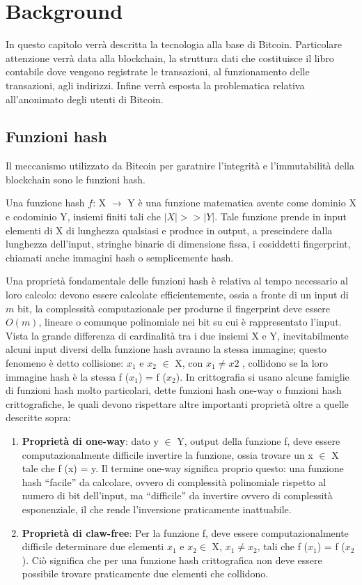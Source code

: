 \chapter{Background}
In questo capitolo verrà descritta la tecnologia alla base di Bitcoin. Particolare attenzione verrà data alla blockchain, la struttura dati che costituisce il libro contabile dove vengono registrate le transazioni, al funzionamento delle transazioni, agli indirizzi. Infine verrà esposta la problematica relativa all'anonimato degli utenti di Bitcoin. 
\section{Funzioni hash}
Il meccanismo utilizzato da Bitcoin per garatnire l'integrità e l'immutabilità della  blockchain sono le funzioni hash.

Una funzione hash $f$: X $\longrightarrow$ Y è una funzione matematica avente come dominio X e codominio Y, insiemi finiti tali che $|X| >> |Y |$. Tale funzione prende in input elementi di X di lunghezza qualsiasi e produce in output, a prescindere dalla lunghezza dell’input, stringhe binarie di dimensione fissa, i cosiddetti fingerprint, chiamati anche immagini hash o semplicemente hash.

Una proprietà fondamentale delle funzioni hash è relativa al tempo necessario al loro calcolo: devono essere calcolate efficientemente, ossia a fronte di un input di $m$ bit, la complessità computazionale per produrne il fingerprint deve essere $O(m)$, lineare o comunque polinomiale nei bit su cui è rappresentato l’input.
Vista la grande differenza di cardinalità tra i due insiemi X e Y, inevitabilmente alcuni input diversi della funzione hash avranno la stessa immagine; questo fenomeno è detto collisione: $x_1$ e $x_2$ $\in$ X, con $x_1 \neq x2$ , collidono se la loro immagine hash è la stessa f ($x_1$) = f ($x_2$).
In crittografia si usano alcune famiglie di funzioni hash molto particolari, dette funzioni hash one-way o funzioni hash crittografiche, le quali devono rispettare altre importanti proprietà oltre a quelle descritte sopra:
\begin{enumerate}
    \item \textbf{Proprietà di one-way}: dato y $\in$ Y, output della funzione f, deve essere computazionalmente difficile invertire la funzione, ossia trovare un x $\in$ X tale che f (x) = y. Il termine one-way significa proprio questo: una funzione hash ``facile” da calcolare, ovvero di complessità polinomiale rispetto al numero di bit dell’input, ma ``difficile” da invertire ovvero di complessità esponenziale, il che rende l’inversione praticamente inattuabile.
    \item \textbf{Proprietà di claw-free}: Per la funzione f, deve essere computazionalmente difficile determinare due elementi $x_1$ e $x_2 \in$ X, $x_1 \neq x_2$, tali che f ($x_1$) = f ($x_2$). Ciò significa che per una funzione hash crittografica non deve essere possibile trovare praticamente due elementi che collidono.
\end{enumerate}
